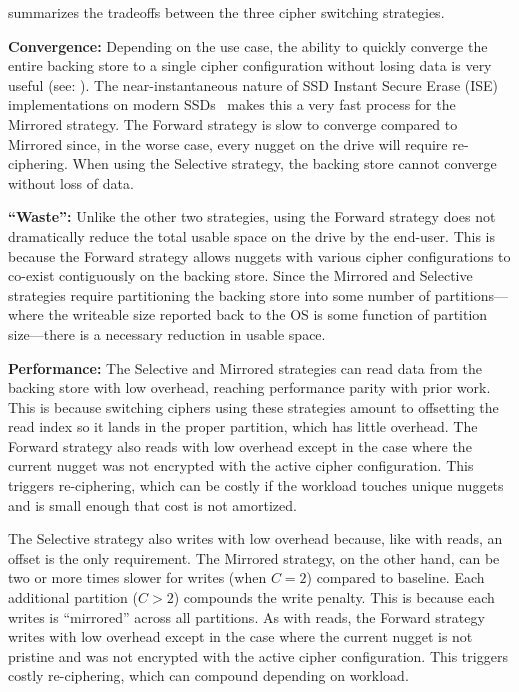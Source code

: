  summarizes the tradeoffs between the three cipher
switching strategies.

\textbf{Convergence:} Depending on the use case, the ability to quickly converge
the entire backing store to a single cipher configuration without losing data is
very useful (see: ). The near-instantaneous nature of SSD
Instant Secure Erase (ISE) implementations on modern SSDs~\cite{ISE1,ISE2,ISE3}
makes this a very fast process for the Mirrored strategy. The Forward strategy
is slow to converge compared to Mirrored since, in the worse case, every nugget on
the drive will require re-ciphering. When using the Selective strategy, the
backing store cannot converge without loss of data. 

\textbf{``Waste'':} Unlike the other two strategies, using the Forward strategy
does not dramatically reduce the total usable space on the drive by the
end-user. This is because the Forward strategy allows nuggets with various
cipher configurations to co-exist contiguously on the backing store. Since the
Mirrored and Selective strategies require partitioning the backing store into
some number of partitions---where the writeable size reported back to the OS is
some function of partition size---there is a necessary reduction in usable
space.

\textbf{Performance:} The Selective and Mirrored strategies can read data from
the backing store with low overhead, reaching performance parity with prior
work. This is because switching ciphers using these strategies amount to
offsetting the read index so it lands in the proper partition, which has little
overhead. The Forward strategy also reads with low overhead except in the case
where the current nugget was not encrypted with the active cipher configuration.
This triggers re-ciphering, which can be costly if the workload touches unique
nuggets and is small enough that cost is not amortized.

The Selective strategy also writes with low overhead because, like with reads,
an offset is the only requirement. The Mirrored strategy, on the other hand, can
be two or more times slower for writes (when $C = 2$) compared to baseline. Each
additional partition ($C > 2$) compounds the write penalty. This is because each
writes is ``mirrored'' across all partitions. As with reads, the Forward
strategy writes with low overhead except in the case where the current nugget is
not pristine and was not encrypted with the active cipher configuration. This
triggers costly re-ciphering, which can compound depending on workload.

